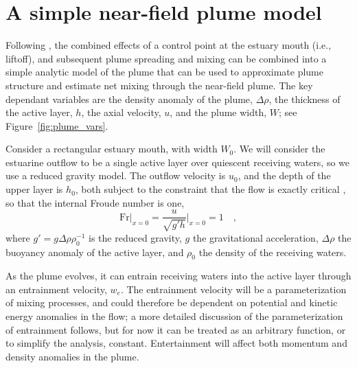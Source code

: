 \documentclass[12pt]{article}
\begin{document}
{\section{A simple near-field plume model}

Following \citep{hetland:10a}, the combined effects of a control point at the estuary mouth (i.e., liftoff), and subsequent plume spreading and mixing can be combined into a simple analytic model of the plume that can be used to approximate plume structure and estimate net mixing through the near-field plume. The key dependant variables are the density anomaly of the plume, $\Delta\rho$, the thickness of the active layer, $h$, the axial velocity, $u$, and the plume width, $W$; see Figure~\ref{fig:plume_vars}. 

Consider a rectangular estuary mouth, with width $W_0$. We will consider the estuarine outflow to be a single active layer over quiescent receiving waters, so we use a reduced gravity model. The outflow velocity is $u_0$, and the depth of the upper layer is $h_0$, both subject to the constraint that the flow is exactly critical \cite[i.e., the mouth acts as a constriction, see][]{armi.farmer:86, farmer.armi:86}, so that the internal Froude number is one,
\begin{equation}
    \mathrm{Fr}\bigg|_{x=0} = \frac{u}{\sqrt{g' h}}\bigg|_{x=0} = 1 \quad ,
\end{equation}
where $g' = g \Delta \rho \rho_0^{-1}$ is the reduced gravity, $g$ the gravitational acceleration, $\Delta \rho$ the buoyancy anomaly of the active layer, and  $\rho_0$ the density of the receiving waters. 

As the plume evolves, it can entrain receiving waters into the active layer through an entrainment velocity, $w_e$. The entrainment velocity will be a parameterization of mixing processes, and could therefore be dependent on potential and kinetic energy anomalies in the flow; a more detailed discussion of the parameterization of entrainment follows, but for now it can be treated as an arbitrary function, or to simplify the analysis, constant. Entertainment will affect both momentum and density anomalies in the plume.

}
\end{document}
